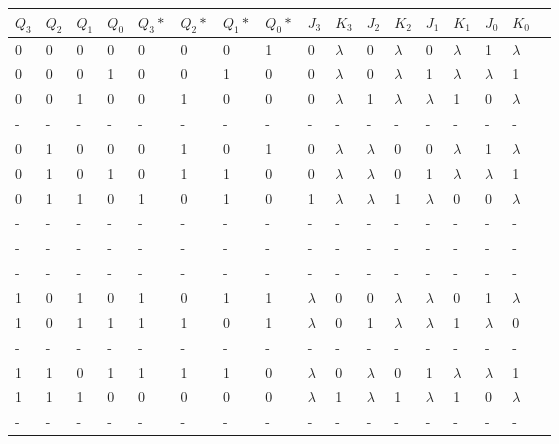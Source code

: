\begin{center}
	\begin{tabular}{ | l | l | l | l | l | l | l | l | l | l | l | l | l | l | l | l | p{1cm} |}
		\hline
	 	$Q_{3}$ & $Q_{2}$ & $Q_{1}$ & $Q_{0}$ & $Q_{3}*$ & $Q_{2}*$ & $Q_{1}*$ & $Q_{0}*$ & $J_{3}$ & $K_{3}$ & $J_{2}$ & $K_{2}$ & $J_{1}$ & $K_{1}$ & $J_{0}$ & $K_{0}$ \\\hline
	 	0 & 0 & 0 & 0 & 0 & 0 & 0 & 1 & 0 & $\lambda$ & 0 & $\lambda$ & 0 & $\lambda$ & 1 & $\lambda$ \\\hline
	 	0 & 0 & 0 & 1 & 0 & 0 & 1 & 0 & 0 & $\lambda$ & 0 & $\lambda$ & 1 & $\lambda$ & $\lambda$ & 1 \\\hline
	 	0 & 0 & 1 & 0 & 0 & 1 & 0 & 0 & 0 & $\lambda$ & 1 & $\lambda$ & $\lambda$ & 1 & 0 & $\lambda$ \\\hline
	 	- & - & - & - & - & - & - & - & - & - & - & - & - & - & - & - \\\hline
	 	0 & 1 & 0 & 0 & 0 & 1 & 0 & 1 & 0 & $\lambda$ & $\lambda$ & 0 & 0 & $\lambda$ & 1 & $\lambda$ \\\hline
	 	0 & 1 & 0 & 1 & 0 & 1 & 1 & 0 & 0 & $\lambda$ & $\lambda$ & 0 & 1 & $\lambda$ & $\lambda$ & 1 \\\hline
	 	0 & 1 & 1 & 0 & 1 & 0 & 1 & 0 & 1 & $\lambda$ & $\lambda$ & 1 & $\lambda$ & 0 & 0 & $\lambda$ \\\hline
	 	- & - & - & - & - & - & - & - & - & - & - & - & - & - & - & - \\\hline
	 	- & - & - & - & - & - & - & - & - & - & - & - & - & - & - & - \\\hline
	 	- & - & - & - & - & - & - & - & - & - & - & - & - & - & - & - \\\hline
	 	1 & 0 & 1 & 0 & 1 & 0 & 1 & 1 & $\lambda$ & 0 & 0 & $\lambda$ & $\lambda$ & 0 & 1 & $\lambda$ \\\hline
	 	1 & 0 & 1 & 1 & 1 & 1 & 0 & 1 & $\lambda$ & 0 & 1 & $\lambda$ & $\lambda$ & 1 & $\lambda$ & 0 \\\hline
	 	- & - & - & - & - & - & - & - & - & - & - & - & - & - & - & - \\\hline
	 	1 & 1 & 0 & 1 & 1 & 1 & 1 & 0 & $\lambda$ & 0 & $\lambda$ & 0 & 1 & $\lambda$ & $\lambda$ & 1 \\\hline
	 	1 & 1 & 1 & 0 & 0 & 0 & 0 & 0 & $\lambda$ & 1 & $\lambda$ & 1 & $\lambda$ & 1 & 0 & $\lambda$ \\\hline
	 	- & - & - & - & - & - & - & - & - & - & - & - & - & - & - & - \\
		\hline
	\end{tabular}


\end{center}
